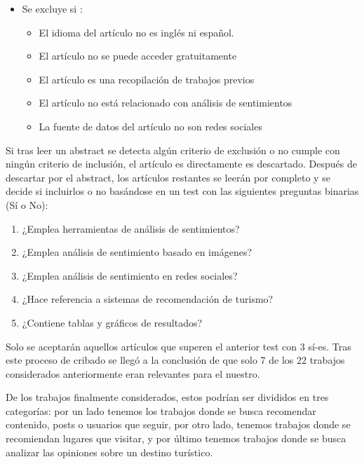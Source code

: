 \begin{enumerate}
\begin{itemize}
        \item Se excluye si :
        \begin{itemize}
            \item El idioma del artículo no es inglés ni español.
            \item El artículo no se puede acceder gratuitamente
            \item El artículo es una recopilación de trabajos previos
            \item El artículo no está relacionado con análisis de sentimientos
            \item La fuente de datos del artículo no son redes sociales
        \end{itemize}
    \end{itemize}

    Si tras leer un abstract se detecta algún criterio de exclusión o no cumple con ningún criterio de inclusión, el artículo es directamente es descartado. Después de descartar por el abstract, los artículos restantes se leerán por completo y se decide si incluirlos o no basándose en un test con las siguientes preguntas binarias (Sí o No):

    \begin{enumerate}
        \item ¿Emplea herramientas de análisis de sentimientos?
        \item ¿Emplea análisis de sentimiento basado en imágenes?
        \item ¿Emplea análisis de sentimiento en redes sociales?
        \item ¿Hace referencia a sistemas de recomendación de turismo?
        \item ¿Contiene tablas y gráficos de resultados?
    \end{enumerate}
    
    Solo se aceptarán aquellos artículos que superen el anterior test con 3 sí-es. Tras este proceso de cribado se llegó a la conclusión de que solo 7 de los 22 trabajos considerados anteriormente eran relevantes para el nuestro.
\end{enumerate}

De los trabajos finalmente considerados, estos podrían ser divididos en tres categorías: por un lado tenemos los trabajos donde se busca recomendar contenido, posts o usuarios que seguir, por otro lado, tenemos trabajos donde se recomiendan lugares que visitar, y por último tenemos trabajos donde se busca analizar las opiniones sobre un destino turístico.\\


